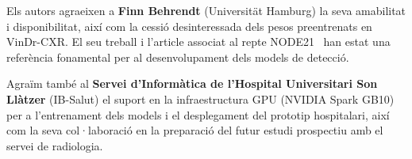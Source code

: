 Els autors agraeixen a \textbf{Finn Behrendt} (Universität Hamburg) la seva amabilitat i disponibilitat, així com la cessió desinteressada dels pesos preentrenats en VinDr-CXR. El seu treball i l'article associat al repte NODE21~\cite{behrendt2023node21} han estat una referència fonamental per al desenvolupament dels models de detecció.

Agraïm també al \textbf{Servei d'Informàtica de l'Hospital Universitari Son Llàtzer} (IB-Salut) el suport en la infraestructura GPU (NVIDIA Spark GB10) per a l'entrenament dels models i el desplegament del prototip hospitalari, així com la seva col·laboració en la preparació del futur estudi prospectiu amb el servei de radiologia.

%
